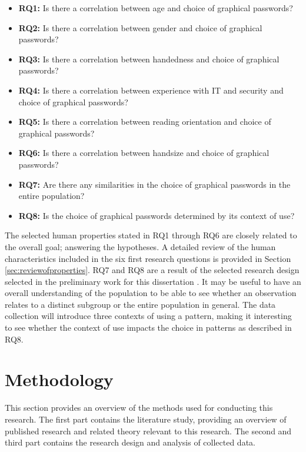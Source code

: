     {\renewcommand\labelitemi{}
      \begin{itemize}[leftmargin=*]
        \item {\bf RQ1:} Is there a correlation between age and choice of graphical passwords?
        \item {\bf RQ2:} Is there a correlation between gender and choice of graphical passwords?
        \item {\bf RQ3:} Is there a correlation between handedness and choice of graphical passwords?
        \item {\bf RQ4:} Is there a correlation between experience with IT and security and choice of graphical passwords?
        \item {\bf RQ5:} Is there a correlation between reading orientation and choice of graphical passwords?
        \item {\bf RQ6:} Is there a correlation between handsize and choice of graphical passwords?
        \item {\bf RQ7:} Are there any similarities in the choice of graphical passwords in the entire population?
        \item {\bf RQ8:} Is the choice of graphical passwords determined by its context of use?
      \end{itemize}
    }

    The selected human properties stated in RQ1 through RQ6 are closely related to the overall goal; answering the hypotheses. A detailed review of the human characteristics included in the six first research questions is provided in Section \ref{sec:reviewofproperties}. RQ7 and RQ8 are a result of the selected research design selected in the preliminary work for this dissertation \cite{prosjektoppgave}. It may be useful to have an overall understanding of the population to be able to see whether an observation relates to a distinct subgroup or the entire population in general. The data collection will introduce three contexts of using a pattern, making it interesting to see whether the context of use impacts the choice in patterns as described in RQ8.

  \clearpage
  \section{Methodology} \label{sec:researchmethods}
    This section provides an overview of the methods used for conducting this research. The first part contains the literature study, providing an overview of published research and related theory relevant to this research. The second and third part contains the research design and analysis of collected data.

